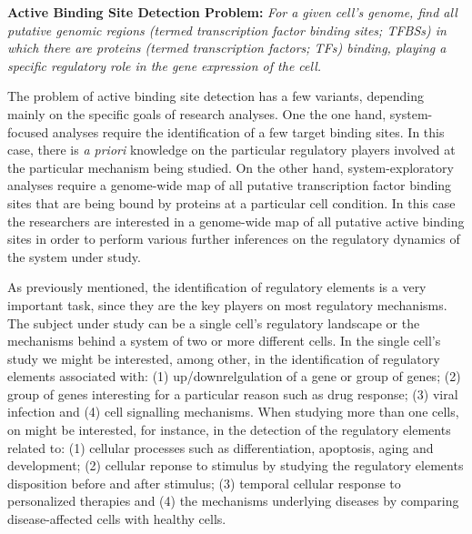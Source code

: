 \vspace{0.5cm}
\noindent
\textbf{Active Binding Site Detection Problem:} \emph{For a given cell's genome, find all putative genomic regions (termed transcription factor binding sites; TFBSs) in which there are proteins (termed transcription factors; TFs) binding, playing a specific regulatory role in the gene expression of the cell.}
\vspace{0.45cm}

The problem of active binding site detection has a few variants, depending mainly on the specific goals of research analyses. One the one hand, system-focused analyses require the identification of a few target binding sites. In this case, there is \emph{a priori} knowledge on the particular regulatory players involved at the particular mechanism being studied. On the other hand, system-exploratory analyses require a genome-wide map of all putative transcription factor binding sites that are being bound by proteins at a particular cell condition. In this case the researchers are interested in a genome-wide map of all putative active binding sites in order to perform various further inferences on the regulatory dynamics of the system under study.

As previously mentioned, the identification of regulatory elements is a very important task, since they are the key players on most regulatory mechanisms. The subject under study can be a single cell's regulatory landscape or the mechanisms behind a system of two or more different cells. In the single cell's study we might be interested, among other, in the identification of regulatory elements associated with: (1) up/downrelgulation of a gene or group of genes; (2) group of genes interesting for a particular reason such as drug response; (3) viral infection and (4) cell signalling mechanisms. When studying more than one cells, on might be interested, for instance, in the detection of the regulatory elements related to: (1) cellular processes such as differentiation, apoptosis, aging and development; (2) cellular reponse to stimulus by studying the regulatory elements disposition before and after stimulus; (3) temporal cellular response to personalized therapies and (4) the mechanisms underlying diseases by comparing disease-affected cells with healthy cells.

